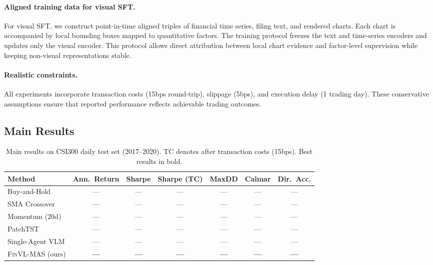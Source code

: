 \paragraph{Aligned training data for visual SFT.}
For visual SFT, we construct point-in-time aligned triples of financial time series, filing text, and rendered charts. Each chart is accompanied by local bounding boxes mapped to quantitative factors. The training protocol freezes the text and time-series encoders and updates only the visual encoder. This protocol allows direct attribution between local chart evidence and factor-level supervision while keeping non-visual representations stable.


\paragraph{Realistic constraints.}
All experiments incorporate transaction costs (15bps round-trip), slippage (5bps), and execution delay (1 trading day). These conservative assumptions ensure that reported performance reflects achievable trading outcomes.

\subsection{Main Results}

\begin{table}[t]
\centering
\caption{Main results on CSI300 daily test set (2017--2020). TC denotes after transaction costs (15bps). Best results in bold.}
\label{tab:main_csi300}
\begin{tabular}{lcccccc}
\toprule
Method & Ann.~Return & Sharpe & Sharpe (TC) & MaxDD & Calmar & Dir.~Acc. \\
\midrule
Buy-and-Hold     & ---  & ---  & ---  & ---  & --- & --- \\
SMA Crossover    & ---  & ---  & ---  & ---  & --- & --- \\
Momentum (20d)   & ---  & ---  & ---  & ---  & --- & --- \\
PatchTST         & ---  & ---  & ---  & ---  & --- & --- \\
Single-Agent VLM & ---  & ---  & ---  & ---  & --- & --- \\
\midrule
\textsc{FinVL-MAS} (ours) & \textbf{---} & \textbf{---} & \textbf{---} & \textbf{---} & \textbf{---} & \textbf{---} \\
\bottomrule
\end{tabular}
\end{table}

